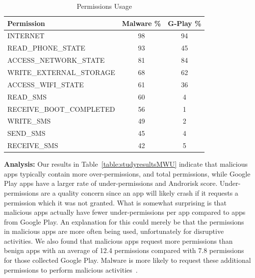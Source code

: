 \documentclass{llncs}
\begin{document}
\begin{table}[h]
\center
\caption{Permissions Usage}
\label{Table:permissions_usage}
 \begin{tabular}{ | l | c | c | } \hline

  \bfseries Permission & \bfseries Malware \%& \bfseries G-Play \%\\ \hline

	INTERNET	& 98 &	94 \\ \hline
	READ\_PHONE\_STATE	& 93 &	45 \\ \hline
	ACCESS\_NETWORK\_STATE	 & 81 &	84 \\ \hline
	WRITE\_EXTERNAL\_STORAGE &	68 &	62 \\ \hline
	ACCESS\_WIFI\_STATE &	61 &	36 \\ \hline
	READ\_SMS &	60 & 	4 \\ \hline
	RECEIVE\_BOOT\_COMPLETED &	56 & 1 \\ \hline
	WRITE\_SMS &	49 &	2 \\ \hline
	SEND\_SMS &	45 &	4 \\ \hline
	RECEIVE\_SMS &	42 &	5 \\ \hline


  \end{tabular}
\end{table}

\noindent
\textbf{Analysis:} Our results in Table~\ref{table:studyresultsMWU} indicate that malicious apps typically contain more over-permissions, and total permissions, while Google Play apps have a larger rate of under-permissions and Androrisk score. Under-permissions are a quality concern since an app will likely crash if it requests a permission which it was not granted. What is somewhat surprising is that malicious apps actually have fewer under-permissions per app compared to apps from Google Play. An explanation for this could merely be that the permissions in malicious apps are more often being used, unfortunately for disruptive activities. We also found that malicious apps request more permissions than benign apps with an average of 12.4 permissions compared with 7.8 permissions for those collected Google Play. Malware is more likely to request these additional permissions to perform malicious activities~\cite{Sarma:2012:APP:2295136.2295141}.

\end{document}
